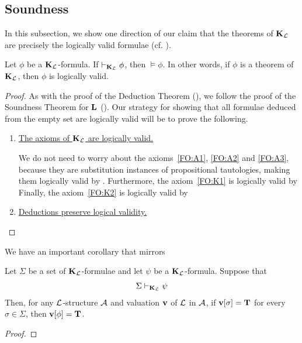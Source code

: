 \subsection{Soundness}

In this subsection, we show one direction of our claim that the theorems of $\mathbf{K}_{\mathcal{L}}$ are precisely the logically valid formulae (cf. ).

\begin{boxtheorem}\label{Ch2:Thm:KLSoundness}
    Let $\phi$ be a $\mathbf{K}_{\mathcal{L}}$-formula. If $\vdash_{\mathbf{K}_{\mathcal{L}}} \phi$, then $\models \phi$. In other words, if $\phi$ is a theorem of $\mathbf{K}_{\mathcal{L}}$, then $\phi$ is logically valid.
\end{boxtheorem}
\begin{proof}
    As with the proof of the Deduction Theorem (), we follow the proof of the Soundness Theorem for $\mathbf{L}$ (). Our strategy for showing that all formulae deduced from the empty set are logically valid will be to prove the following.
    \begin{enumerate}
        \item \underline{The axioms of $\mathbf{K}_{\mathcal{L}}$ are logically valid.}

        We do not need to worry about the axioms~\ref{FO:A1}, \ref{FO:A2} and \ref{FO:A3}, because they are substitution instances of propositional tautologies, making them logically valid by . Furthermore, the axiom~\ref{FO:K1} is logically valid by \sorry %
        Finally, the axiom~\ref{FO:K2} is logically valid by \sorry %

        \item \underline{Deductions preserve logical validity.}

        \sorry %
    \end{enumerate}
\end{proof}

We have an important corollary that mirrors \sorry %

\begin{boxcorollary}
    Let $\Sigma$ be a set of $\mathbf{K}_{\mathcal{L}}$-formulae and let $\psi$ be a $\mathbf{K}_{\mathcal{L}}$-formula. Suppose that
    \begin{align*}
        \Sigma \vdash_{\mathbf{K}_{\mathcal{L}}} \psi
    \end{align*}
    Then, for any $\mathcal{L}$-structure $\mathcal{A}$ and valuation $\mathbf{v}$ of $\mathcal{L}$ in $\mathcal{A}$, if $\mathbf{v}\!\left[ \sigma \right] = \mathbf{T}$ for every $\sigma \in \Sigma$, then $\mathbf{v}\!\left[ \phi \right] = \mathbf{T}$.
\end{boxcorollary}
\begin{proof}
    \sorry %
\end{proof}

